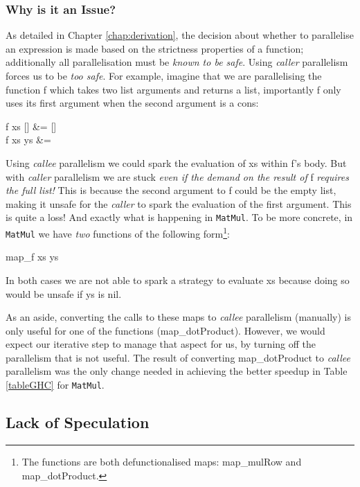 \subsubsection*{Why is it an Issue?}

As detailed in Chapter \ref{chap:derivation}, the decision about whether to parallelise
an expression is made based on the strictness properties of a function; additionally
all parallelisation must be \emph{known to be safe}. Using \emph{caller} parallelism
forces us to be \emph{too safe}. For example, imagine that we are parallelising
the function \<f\> which takes two list arguments and returns a list, importantly
\<f\> only uses its first argument when the second argument is a \<cons\>:

\begin{haskell}
f xs [] &= [] \\
f xs ys &= 
\end{haskell}

Using \emph{callee} parallelism we could spark the evaluation of \<xs\> within
\<f\>'s body. But with \emph{caller} parallelism we are stuck \emph{even if the
demand on the result of} \<f\> \emph{requires the full list!} This is because
the second argument to \<f\> could be the empty list, making it unsafe for the
\emph{caller} to spark the evaluation of the first argument. This is quite a
loss! And exactly what is happening in \verb|MatMul|. To be more concrete, in
\verb|MatMul| we have \emph{two} functions of the following form\footnote{The
functions are both defunctionalised \<map\>s: \<map_{mulRow}\> and
\<map_{dotProduct}\>.}:

\begin{haskell}
map_{f} xs ys 
\end{haskell}

In both cases we are not able to spark a strategy to evaluate \<xs\> because doing
so would be unsafe if \<ys\> is \<nil\>.

As an aside, converting the calls to these \<map\>s to \emph{callee}
parallelism (manually) is only useful for one of the functions
(\<map_{dotProduct}\>). However, we would expect our iterative step to manage
that aspect for us, by turning off the parallelism that is not useful. The
result of converting \<map_{dotProduct}\> to \emph{callee} parallelism was the
only change needed in achieving the better speedup in Table \ref{tableGHC} for
\verb|MatMul|.


\subsection{Lack of Speculation}

